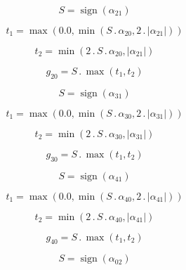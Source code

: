 \documentclass{article}
\begin{document}
\begin{dmath}S = \operatorname{sign}{\left (\alpha_{21} \right )}\end{dmath}

\begin{dmath}t_{1} = \max\left(0.0, \min\left(S \,.\, \alpha_{20}, 2 \,.\, \left|{\alpha_{21}}\right|\right)\right)\end{dmath}

\begin{dmath}t_{2} = \min\left(2 \,.\, S \,.\, \alpha_{20}, \left|{\alpha_{21}}\right|\right)\end{dmath}

\begin{dmath}g_{20} = S \,.\, \max\left(t_{1}, t_{2}\right)\end{dmath}

\begin{dmath}S = \operatorname{sign}{\left (\alpha_{31} \right )}\end{dmath}

\begin{dmath}t_{1} = \max\left(0.0, \min\left(S \,.\, \alpha_{30}, 2 \,.\, \left|{\alpha_{31}}\right|\right)\right)\end{dmath}

\begin{dmath}t_{2} = \min\left(2 \,.\, S \,.\, \alpha_{30}, \left|{\alpha_{31}}\right|\right)\end{dmath}

\begin{dmath}g_{30} = S \,.\, \max\left(t_{1}, t_{2}\right)\end{dmath}

\begin{dmath}S = \operatorname{sign}{\left (\alpha_{41} \right )}\end{dmath}

\begin{dmath}t_{1} = \max\left(0.0, \min\left(S \,.\, \alpha_{40}, 2 \,.\, \left|{\alpha_{41}}\right|\right)\right)\end{dmath}

\begin{dmath}t_{2} = \min\left(2 \,.\, S \,.\, \alpha_{40}, \left|{\alpha_{41}}\right|\right)\end{dmath}

\begin{dmath}g_{40} = S \,.\, \max\left(t_{1}, t_{2}\right)\end{dmath}

\begin{dmath}S = \operatorname{sign}{\left (\alpha_{02} \right )}\end{dmath}
\end{document}
